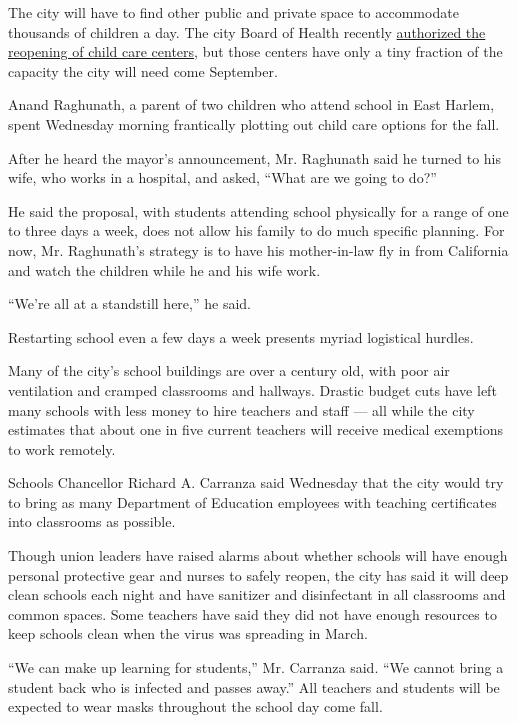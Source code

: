 The city will have to find other public and private space to accommodate
thousands of children a day. The city Board of Health recently
\href{https://ny.chalkbeat.org/2020/7/7/21316621/nyc-preschools-can-reopen}{authorized
the reopening of child care centers}, but those centers have only a tiny
fraction of the capacity the city will need come September.

Anand Raghunath, a parent of two children who attend school in East
Harlem, spent Wednesday morning frantically plotting out child care
options for the fall.

After he heard the mayor's announcement, Mr. Raghunath said he turned to
his wife, who works in a hospital, and asked, ``What are we going to
do?''

He said the proposal, with students attending school physically for a
range of one to three days a week, does not allow his family to do much
specific planning. For now, Mr. Raghunath's strategy is to have his
mother-in-law fly in from California and watch the children while he and
his wife work.

``We're all at a standstill here,'' he said.

Restarting school even a few days a week presents myriad logistical
hurdles.

Many of the city's school buildings are over a century old, with poor
air ventilation and cramped classrooms and hallways. Drastic budget cuts
have left many schools with less money to hire teachers and staff ---
all while the city estimates that about one in five current teachers
will receive medical exemptions to work remotely.

Schools Chancellor Richard A. Carranza said Wednesday that the city
would try to bring as many Department of Education employees with
teaching certificates into classrooms as possible.

Though union leaders have raised alarms about whether schools will have
enough personal protective gear and nurses to safely reopen, the city
has said it will deep clean schools each night and have sanitizer and
disinfectant in all classrooms and common spaces. Some teachers have
said they did not have enough resources to keep schools clean when the
virus was spreading in March.

``We can make up learning for students,'' Mr. Carranza said. ``We cannot
bring a student back who is infected and passes away.'' All teachers and
students will be expected to wear masks throughout the school day come
fall.

